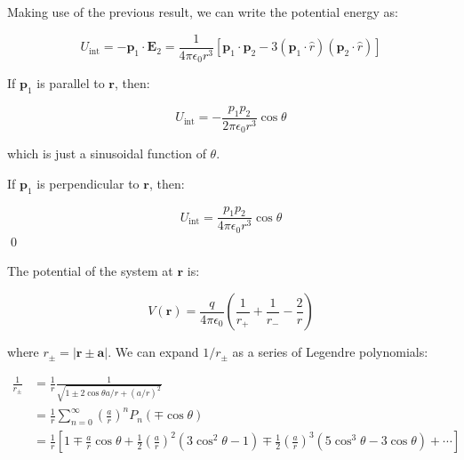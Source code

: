\documentclass[12pt]{article}
\begin{document}
Making use of the previous result, we can write the potential energy as:

\begin{equation}
    U_{\text{int}} = -\mathbf{p}_{1} \cdot \mathbf{E}_{2} = \frac{1}{4\pi\epsilon_{0}r^{3}} \left[ \mathbf{p}_{1} \cdot \mathbf{p}_{2} - 3(\mathbf{p}_{1} \cdot \hat{r})(\mathbf{p}_{2} \cdot \hat{r}) \right]
\end{equation}


If $\mathbf{p}_{1}$ is parallel to $\mathbf{r}$, then:

\begin{equation}
    U_{\text{int}} = -\frac{p_{1}p_{2}}{2\pi\epsilon_{0}r^{3}} \cos{\theta}
\end{equation}

which is just a sinusoidal function of $\theta$.

If $\mathbf{p}_{1}$ is perpendicular to $\mathbf{r}$, then:

\begin{equation}
    U_{\text{int}} = \frac{p_{1}p_{2}}{4\pi\epsilon_{0}r^{3}} \cos{\theta}
\end{equation}
\qed



The potential of the system at $\mathbf{r}$ is:

\begin{equation}
    V(\mathbf{r}) = \frac{q}{4\pi\epsilon_{0}} \left( \frac{1}{r_{+}} + \frac{1}{r_{-}} - \frac{2}{r} \right)
\end{equation}

where $r_{\pm} = \left\lvert \mathbf{r} \pm \mathbf{a} \right\rvert$. We can expand $1/r_{\pm}$ as a series of Legendre polynomials:

\begin{equation}
    \begin{split}
        \frac{1}{r_{\pm}} &= \frac{1}{r} \frac{1}{\sqrt{1 \pm 2 \cos{\theta} a/r + \left( a/r \right)^{2}}} \\
        &= \frac{1}{r} \sum_{n=0}^{\infty} \left( \frac{a}{r} \right)^{n} P_{n}(\mp \cos{\theta}) \\
        &= \frac{1}{r} \left[ 1 \mp \frac{a}{r} \cos{\theta} + \frac{1}{2} \left( \frac{a}{r} \right)^{2} \left( 3 \cos^{2}{\theta} - 1 \right) \mp \frac{1}{2} \left( \frac{a}{r} \right)^{3} \left( 5 \cos^{3}{\theta} - 3 \cos{\theta} \right) + \cdots \right]
    \end{split}
\end{equation}
\end{document}
